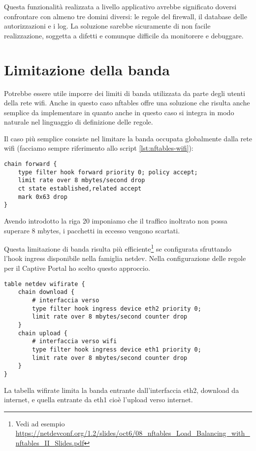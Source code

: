 Questa funzionalit\`a realizzata a livello applicativo avrebbe significato
doversi confrontare con almeno tre domini diversi: le regole del firewall, il
database delle autorizzazioni e i log. La soluzione sarebbe sicuramente di non
facile realizzazione, soggetta a difetti e comunque difficile da monitorere e
debuggare.

\section{Limitazione della banda}

Potrebbe essere utile imporre dei limiti di banda utilizzata da parte degli
utenti della rete wifi. Anche in questo caso nftables offre una soluzione che
risulta anche semplice da implementare in quanto anche in questo caso si
integra in modo naturale nel linguaggio di definizione delle regole.

Il caso pi\`u semplice consiste nel limitare la banda occupata globalmente
dalla rete wifi (facciamo sempre riferimento allo script \ref{lst:nftables-wifi}):

\begin{lstlisting}[style=customc,firstnumber=18]
chain forward {
    type filter hook forward priority 0; policy accept;
    limit rate over 8 mbytes/second drop
    ct state established,related accept
    mark 0x63 drop
}
\end{lstlisting}
Avendo introdotto la riga 20 imponiamo che il traffico inoltrato non possa
superare 8 mbytes, i pacchetti in eccesso vengono scartati.

Questa limitazione di banda risulta pi\`u efficiente\footnote{Vedi ad esempio
\url{https://netdevconf.org/1.2/slides/oct6/08\_nftables\_Load\_Balancing\_with\_nftables\_II\_Slides.pdf}}
se configurata sfruttando l'hook ingress disponibile nella famiglia netdev.
Nella configurazione delle regole per il Captive Portal ho scelto questo
approccio.
\begin{lstlisting}[style=customc,firstnumber=18]
table netdev wifirate {
    chain download {
        # interfaccia verso
        type filter hook ingress device eth2 priority 0;
        limit rate over 8 mbytes/second counter drop
    }
    chain upload {
        # interfaccia verso wifi
        type filter hook ingress device eth1 priority 0;
        limit rate over 8 mbytes/second counter drop
    }
}
\end{lstlisting}
La tabella wifirate limita la banda entrante dall'interfaccia eth2, download da internet,
e quella entrante da eth1 cio\`e l'upload verso internet.

